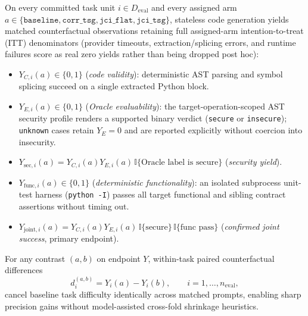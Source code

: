 On every committed task unit $i \in D_{\mathrm{eval}}$ and every assigned arm
$a \in \{\texttt{baseline}, \texttt{corr\_tsg}, \texttt{jci\_flat},
\texttt{jci\_tsg}\}$, stateless code generation yields matched counterfactual
observations retaining full assigned-arm intention-to-treat (ITT) denominators
(provider timeouts, extraction/splicing errors, and runtime failures score as
real zero yields rather than being dropped post hoc):
\begin{itemize}
  \item $Y_{C,i}(a) \in \{0,1\}$ (\emph{code validity}): deterministic AST
  parsing and symbol splicing succeed on a single extracted Python block.
  \item $Y_{E,i}(a) \in \{0,1\}$ (\emph{Oracle evaluability}): the
  target-operation-scoped AST security profile renders a supported binary
  verdict (\texttt{secure} or \texttt{insecure}); \texttt{unknown} cases retain
  $Y_E = 0$ and are reported explicitly without coercion into insecurity.
  \item $Y_{\mathrm{sec},i}(a) = Y_{C,i}(a) Y_{E,i}(a)\,\mathbb{I}\{\text{Oracle label is secure}\}$
  (\emph{security yield}).
  \item $Y_{\mathrm{func},i}(a) \in \{0,1\}$ (\emph{deterministic functionality}):
  an isolated subprocess unit-test harness (\texttt{python -I}) passes all
  target functional and sibling contract assertions without timing out.
  \item $Y_{\mathrm{joint},i}(a) = Y_{C,i}(a) Y_{E,i}(a)\,
  \mathbb{I}\{\text{secure}\}\,\mathbb{I}\{\text{func pass}\}$ (\emph{confirmed
  joint success}, primary endpoint).
\end{itemize}
For any contrast $(a,b)$ on endpoint $Y$, within-task paired counterfactual
differences
\begin{equation}
  d_i^{(a,b)} = Y_i(a) - Y_i(b), \qquad i = 1,\dots,n_{\mathrm{eval}},
  \label{eq:paired-diff}
\end{equation}
cancel baseline task difficulty identically across matched prompts, enabling
sharp precision gains without model-assisted cross-fold shrinkage heuristics.
